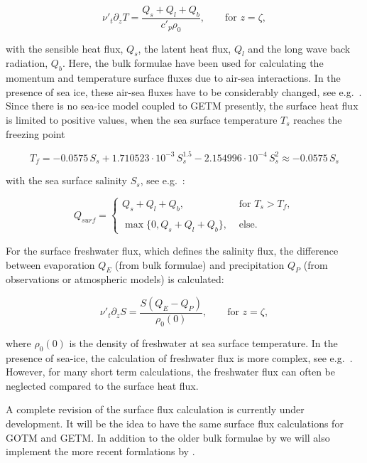 \begin{equation}\label{TempFlux}
\nu'_t \partial_z T= \frac{Q_s+Q_l+Q_b}{c'_p \rho_0},
\qquad \mbox{for } z=\zeta,
\end{equation}

with the sensible 
heat flux, $Q_s$, the 
latent heat flux, $Q_l$ and the
long wave back radiation,
$Q_b$. Here, the \cite{KONDO75} 
bulk formulae have been used for calculating the
momentum and temperature surface fluxes
due to air-sea interactions. 
In the presence of sea ice, these air-sea fluxes have to be considerably
changed, see e.g.\ \cite{KANTHAea00b}. 
Since there is no sea-ice model coupled to GETM presently,
the surface heat flux is limited to positive values, 
when the sea surface temperature $T_s$ reaches the freezing point

\begin{equation}\label{freezingpoint}
T_f=-0.0575\,S_s+1.710523\cdot 10^{-3}\, S_s^{1.5}
-2.154996\cdot 10^{-4}\,S_s^2\approx -0.0575\,S_s
\end{equation}

with the sea surface salinity $S_s$, see e.g.\ \cite{KANTHAea00}:

\begin{equation}\label{primitive_ice_model} 
Q_{surf} = \left\{
\begin{array}{ll}
Q_s+Q_l+Q_b, & \mbox{ for } T_s > T_f, \\ \\
\max\{0,Q_s+Q_l+Q_b\}, & \mbox{ else.}
\end{array}
\right.
\end{equation}

For the surface freshwater flux,
which defines the salinity flux, the difference between evaporation $Q_E$
(from 
bulk formulae) and precipitation $Q_P$ (from observations or
atmospheric models) is calculated:

\begin{equation}\label{SalFlux}
\nu'_t\partial_z S = \frac{S(Q_E-Q_P)}{\rho_0(0)},
\qquad \mbox{for } z=\zeta,
\end{equation}

where $\rho_0(0)$ is the density of freshwater at sea surface temperature.
In the presence of sea-ice, the calculation of freshwater flux
is more complex, see e.g.\ \cite{LARGEea94}.
However, for many short term calculations, the freshwater
flux can often be neglected compared to the surface 
heat flux.

A complete revision of the surface flux calculation is currently under
development. It will be the idea to have the same surface flux calculations
for GOTM and GETM. In addition to the older bulk formulae by \cite{KONDO75}
we will also implement the more recent formlations by 
\cite{FAIRALLea96}.

